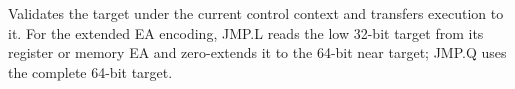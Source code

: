 Validates the target under the current control context and transfers execution to it. For the extended EA encoding, JMP.L reads the low 32-bit target from its register or memory EA and zero-extends it to the 64-bit near target; JMP.Q uses the complete 64-bit target.
